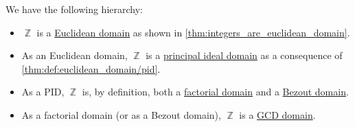\begin{remark}\label{rem:integer_domain_chain}
  We have the following hierarchy:
  \begin{itemize}
    \item \( \BbbZ \) is a \hyperref[def:euclidean_domain]{Euclidean domain} as shown in \cref{thm:integers_are_euclidean_domain}.
    \item As an Euclidean domain, \( \BbbZ \) is a \hyperref[def:principal_ideal_domain]{principal ideal domain} as a consequence of \cref{thm:def:euclidean_domain/pid}.
    \item As a PID, \( \BbbZ \) is, by definition, both a \hyperref[def:factorial_domain]{factorial domain} and a \hyperref[def:bezout_domain]{Bezout domain}.
    \item As a factorial domain (or as a Bezout domain), \( \BbbZ \) is a \hyperref[def:gcd_domain]{GCD domain}.
  \end{itemize}
\end{remark}

